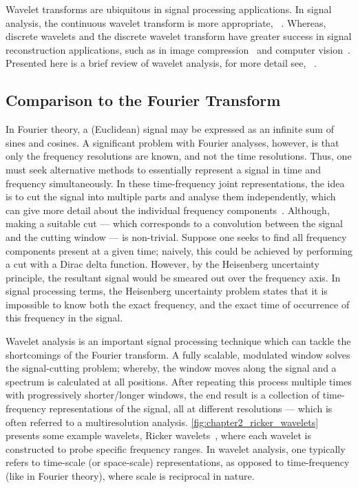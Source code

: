 Wavelet transforms are ubiquitous in signal processing applications.
In signal analysis, the continuous wavelet transform is more appropriate, \eg{}~\cite{Goupillaud1984,KronlandMartinet1987,Flandrin1989,Holschneider1990,Bertrand1990,Pierce1991}.
Whereas, discrete wavelets and the discrete wavelet transform have greater success in signal reconstruction applications, such as in image compression~\cite{Antonini1990,Mallat1992} and computer vision~\cite{Mallat1989,Shensa1992}.
Presented here is a brief review of wavelet analysis, for more detail see, \eg{}~\cite{Rioul1991,Graps1995,Addison2005,Valens1999,Kaiser2011}.

\subsection{Comparison to the Fourier Transform}\label{sec:chapter2_comparison_fourier_transform}

In Fourier theory, a (Euclidean) signal may be expressed as an infinite sum of sines and cosines.
A significant problem with Fourier analyses, however, is that only the frequency resolutions are known, and not the time resolutions.
Thus, one must seek alternative methods to essentially represent a signal in time and frequency simultaneously.
In these time-frequency joint representations, the idea is to cut the signal into multiple parts and analyse them independently, which can give more detail about the individual frequency components~\cite{Mallat2008}.
Although, making a suitable cut --- which corresponds to a convolution between the signal and the cutting window --- is non-trivial.
Suppose one seeks to find all frequency components present at a given time; naively, this could be achieved by performing a cut with a Dirac delta function.
However, by the Heisenberg uncertainty principle, the resultant signal would be smeared out over the frequency axis.
In signal processing terms, the Heisenberg uncertainty problem states that it is impossible to know both the exact frequency, and the exact time of occurrence of this frequency in the signal.

Wavelet analysis is an important signal processing technique which can tackle the shortcomings of the Fourier transform.
A fully scalable, modulated window solves the signal-cutting problem; whereby, the window moves along the signal and a spectrum is calculated at all positions.
After repeating this process multiple times with progressively shorter/longer windows, the end result is a collection of time-frequency representations of the signal, all at different resolutions --- which is often referred to a multiresolution analysis.
\cref{fig:chapter2_ricker_wavelets} presents some example wavelets, Ricker wavelets~\cite{Ricker1953}, where each wavelet is constructed to probe specific frequency ranges.
In wavelet analysis, one typically refers to time-scale (or space-scale) representations, as opposed to time-frequency (like in Fourier theory), where scale is reciprocal in nature.

